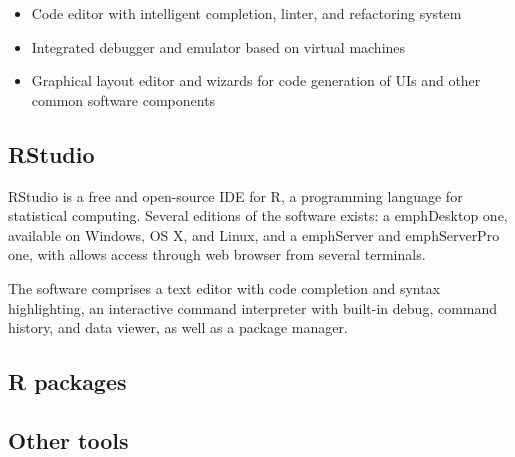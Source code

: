 \begin{itemize}
	\item Code editor with intelligent completion, linter, and refactoring system
	\item Integrated debugger and emulator based on virtual machines
	\item Graphical layout editor and wizards for code generation of UIs and other common software components
\end{itemize}



\subsection{RStudio}
RStudio is a free and open-source IDE for R, a programming language for statistical computing.
Several editions of the software exists: a emph{Desktop} one, available on Windows, OS X, and Linux, and a emph{Server} and emph{ServerPro} one, with allows access through web browser from several terminals.

The software comprises a text editor with code completion and syntax highlighting, an interactive command interpreter with built-in debug, command history, and data viewer, as well as a package manager.


\subsection{R packages}



\subsection{Other tools}
